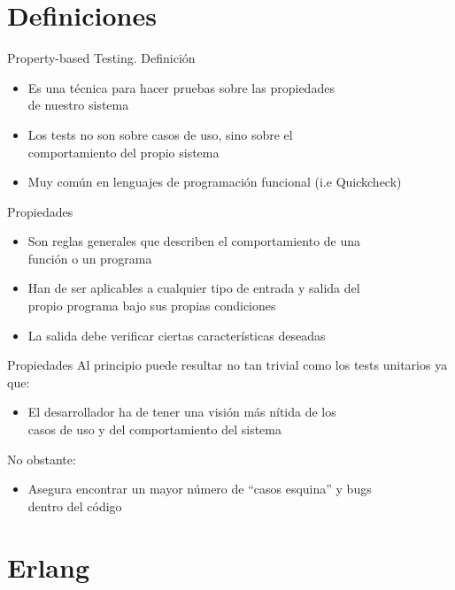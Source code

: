 \documentclass{beamer}
\begin{document}
  \section{Definiciones}
    \begin{frame}{Property-based Testing. Definición}
      \begin{itemize}
        \item Es una técnica para hacer pruebas sobre las propiedades\\
        de nuestro sistema
        \item Los tests no son sobre casos de uso, sino sobre el\\
        comportamiento del propio sistema
        \item Muy común en lenguajes de programación funcional (i.e Quickcheck)
      \end{itemize}
    \end{frame}
    \begin{frame}{Propiedades}
      \begin{itemize}
        \item Son reglas generales que describen el comportamiento de una\\
        función o un programa
        \item Han de ser aplicables a cualquier tipo de entrada y salida del\\
        propio programa bajo sus propias condiciones
        \item La salida debe verificar ciertas características deseadas
      \end{itemize}
    \end{frame}
    \begin{frame}{Propiedades}
      Al principio puede resultar no tan trivial como los tests unitarios ya que:
      \begin{itemize}
        \item El desarrollador ha de tener una visión más nítida de los\\
        casos de uso y del comportamiento del sistema
      \end{itemize}
      No obstante:
      \begin{itemize}
        \item Asegura encontrar un mayor número de ``casos esquina'' y bugs\\
        dentro del código
      \end{itemize}
    \end{frame}
  \section{Erlang}
\end{document}
